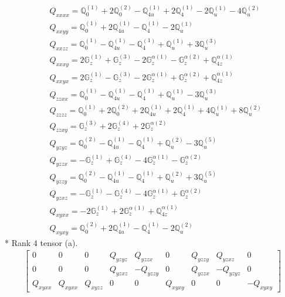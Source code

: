 \documentclass[fleqn,8pt,landscape]{jsarticle}
\begin{document}
\begin{align*}
& Q_{xxxx} = \mathbb{Q}_{0}^{(1)} + 2 \mathbb{Q}_{0}^{(2)} - \mathbb{Q}_{4u}^{(1)} + 2 \mathbb{Q}_{4}^{(1)} - 2 \mathbb{Q}_{u}^{(1)} - 4 \mathbb{Q}_{u}^{(2)} \\
& Q_{xxyy} = \mathbb{Q}_{0}^{(1)} + 2 \mathbb{Q}_{4u}^{(1)} - \mathbb{Q}_{4}^{(1)} - 2 \mathbb{Q}_{u}^{(1)} \\
& Q_{xxzz} = \mathbb{Q}_{0}^{(1)} - \mathbb{Q}_{4u}^{(1)} - \mathbb{Q}_{4}^{(1)} + \mathbb{Q}_{u}^{(1)} + 3 \mathbb{Q}_{u}^{(3)} \\
& Q_{xxxy} = 2 \mathbb{G}_{z}^{(1)} + \mathbb{G}_{z}^{(3)} - 2 \mathbb{G}_{z}^{\alpha(1)} - \mathbb{G}_{z}^{\alpha(2)} + \mathbb{Q}_{4z}^{\alpha(1)} \\
& Q_{xxyx} = 2 \mathbb{G}_{z}^{(1)} - \mathbb{G}_{z}^{(3)} - 2 \mathbb{G}_{z}^{\alpha(1)} + \mathbb{G}_{z}^{\alpha(2)} + \mathbb{Q}_{4z}^{\alpha(1)} \\
& Q_{zzxx} = \mathbb{Q}_{0}^{(1)} - \mathbb{Q}_{4u}^{(1)} - \mathbb{Q}_{4}^{(1)} + \mathbb{Q}_{u}^{(1)} - 3 \mathbb{Q}_{u}^{(3)} \\
& Q_{zzzz} = \mathbb{Q}_{0}^{(1)} + 2 \mathbb{Q}_{0}^{(2)} + 2 \mathbb{Q}_{4u}^{(1)} + 2 \mathbb{Q}_{4}^{(1)} + 4 \mathbb{Q}_{u}^{(1)} + 8 \mathbb{Q}_{u}^{(2)} \\
& Q_{zzxy} = \mathbb{G}_{z}^{(3)} + 2 \mathbb{G}_{z}^{(4)} + 2 \mathbb{G}_{z}^{\alpha(2)} \\
& Q_{yzyz} = \mathbb{Q}_{0}^{(2)} - \mathbb{Q}_{4u}^{(1)} - \mathbb{Q}_{4}^{(1)} + \mathbb{Q}_{u}^{(2)} - 3 \mathbb{Q}_{u}^{(5)} \\
& Q_{yzzx} = - \mathbb{G}_{z}^{(1)} + \mathbb{G}_{z}^{(4)} - 4 \mathbb{G}_{z}^{\alpha(1)} - \mathbb{G}_{z}^{\alpha(2)} \\
& Q_{yzzy} = \mathbb{Q}_{0}^{(2)} - \mathbb{Q}_{4u}^{(1)} - \mathbb{Q}_{4}^{(1)} + \mathbb{Q}_{u}^{(2)} + 3 \mathbb{Q}_{u}^{(5)} \\
& Q_{yzxz} = - \mathbb{G}_{z}^{(1)} - \mathbb{G}_{z}^{(4)} - 4 \mathbb{G}_{z}^{\alpha(1)} + \mathbb{G}_{z}^{\alpha(2)} \\
& Q_{xyxx} = - 2 \mathbb{G}_{z}^{(1)} + 2 \mathbb{G}_{z}^{\alpha(1)} + \mathbb{Q}_{4z}^{\alpha(1)} \\
& Q_{xyxy} = \mathbb{Q}_{0}^{(2)} + 2 \mathbb{Q}_{4u}^{(1)} - \mathbb{Q}_{4}^{(1)} - 2 \mathbb{Q}_{u}^{(2)}
\end{align*}
* Rank 4 tensor (a).
\begin{align*}
\begin{bmatrix} 0 & 0 & 0 & Q_{yzyz} & Q_{yzzx} & 0 & Q_{yzzy} & Q_{yzxz} & 0 \\ 0 & 0 & 0 & Q_{yzxz} & - Q_{yzzy} & 0 & Q_{yzzx} & - Q_{yzyz} & 0 \\ Q_{xyxx} & Q_{xyxx} & Q_{xyzz} & 0 & 0 & Q_{xyxy} & 0 & 0 & - Q_{xyxy} \end{bmatrix}
\end{align*}
\end{document}
